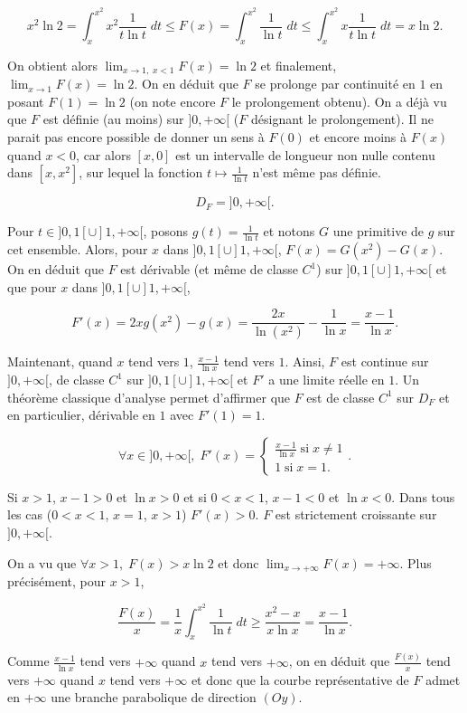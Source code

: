 {{$$x^2\ln2=\int_{x}^{x^2}x^2\frac{1}{t\ln t}\;dt\leq F(x)=\int_{x}^{x^2}\frac{1}{\ln t}\;dt\leq\int_{x}^{x^2}x\frac{1}{t\ln t}\;dt=x\ln 2.$$

On obtient alors $\lim_{x\rightarrow 1,\;x<1}F(x)=\ln2$ et finalement, $\lim_{x\rightarrow 1}F(x)=\ln2$. On en déduit que $F$ se prolonge par continuité en $1$ en posant $F(1)=\ln 2$ (on note encore $F$ le prolongement obtenu).
On a déjà vu que $F$ est définie (au moins) sur $]0,+\infty[$ ($F$ désignant le prolongement). Il ne parait pas encore possible de donner un sens à $F(0)$ et encore moins à $F(x)$ quand $x<0$, car alors $[x,0]$ est un intervalle de longueur non nulle contenu dans $[x,x^2]$, sur lequel la fonction $t\mapsto\frac{1}{\ln t}$ n'est même pas définie.

$$D_F=]0,+\infty[.$$

Pour $t\in]0,1[\cup]1,+\infty[$, posons $g(t)=\frac{1}{\ln t}$ et notons $G$ une primitive de $g$ sur cet ensemble. Alors, pour $x$ dans $]0,1[\cup]1,+\infty[$, $F(x)=G(x^2)-G(x)$. On en déduit que $F$ est dérivable (et même de classe $C^1$) sur $]0,1[\cup]1,+\infty[$ et que pour $x$ dans $]0,1[\cup]1,+\infty[$,

$$F'(x)=2xg(x^2)-g(x)=\frac{2x}{\ln(x^2)}-\frac{1}{\ln x}=\frac{x-1}{\ln x}.$$

Maintenant, quand $x$ tend vers $1$, $\frac{x-1}{\ln x}$ tend vers $1$. Ainsi, $F$ est continue sur $]0,+\infty[$, de classe $C^1$ sur $]0,1[\cup]1,+\infty[$ et $F'$ a une limite réelle en $1$. Un théorème classique d'analyse permet d'affirmer que  $F$ est de classe $C^1$ sur $D_F$ et en particulier, dérivable en $1$ avec $F'(1)=1$.

$$\forall x\in]0,+\infty[,\;F'(x)=\left\{
\begin{array}{l}
\frac{x-1}{\ln x}\;\mbox{si}\;x\neq1\\
1\;\mbox{si}\;x=1.
\end{array}
\right..$$

Si $x>1$, $x-1>0$ et $\ln x>0$ et si $0<x<1$, $x-1<0$ et $\ln x<0$. Dans tous les cas ($0<x<1$, $x=1$, $x>1$)  $F'(x)>0$. $F$ est strictement croissante sur $]0,+\infty[$.

On a vu que $\forall x>1,\;F(x)>x\ln2$ et donc $\lim_{x\rightarrow +\infty}F(x)=+\infty$. Plus précisément, pour $x>1$,

$$\frac{F(x)}{x}=\frac{1}{x}\int_{x}^{x^2}\frac{1}{\ln t}\;dt\geq\frac{x^2-x}{x\ln x}=\frac{x-1}{\ln x}.$$

Comme $\frac{x-1}{\ln x}$ tend vers $+\infty$ quand $x$ tend vers $+\infty$, on en déduit que $\frac{F(x)}{x}$ tend vers $+\infty$ quand $x$ tend vers $+\infty$ et donc que la courbe représentative de $F$ admet en $+\infty$ une branche parabolique de direction $(Oy)$.

}}
